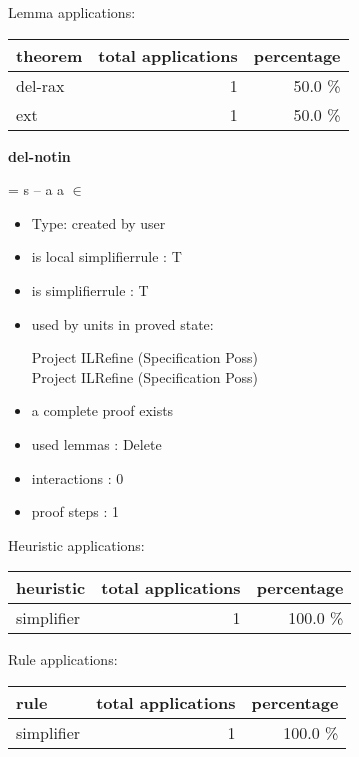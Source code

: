 \documentclass[a4paper]{article}
\begin{document}
Lemma applications:

\begin{supertabular}{l|r|r}
theorem	        & total applications & percentage \\ \hline
del-rax & 1 & 50.0 \% \\
ext & 1 & 50.0 \% \\

\end{supertabular}
\pagebreak

{\LARGE\bf del-notin}\label{lemma-del-notin}

\medskip

 \Fol {} = s -- a \Imp \Not a $\in$ 

\begin{itemize}

\item Type: created by user

\item is local simplifierrule : T
\item is simplifierrule : T
\item used by units in proved state:

Project ILRefine (Specification Poss) \\
Project ILRefine (Specification Poss)
\item       a complete proof exists
\item       used lemmas  : Delete
\item       interactions : 0
\item       proof steps  : 1
\end{itemize}

\medskip


Heuristic applications:

\begin{supertabular}{l|r|r}
heuristic	& total applications & percentage \\ \hline
simplifier & 1 & 100.0 \% \\

\end{supertabular}

Rule applications:

\begin{supertabular}{l|r|r}
rule	        & total applications & percentage \\ \hline
simplifier & 1 & 100.0 \% \\

\end{supertabular}
\end{document}
